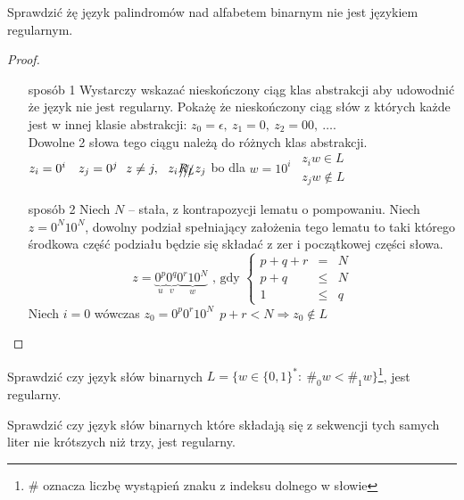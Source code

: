 	\begin{przyklad}
		Sprawdzić żę język palindromów nad alfabetem binarnym nie jest językiem regularnym.
		\begin{proof}
			\begin{itemize}
				\item[sposób 1] Wystarczy wskazać nieskończony ciąg klas abstrakcji aby udowodnić że język nie jest regularny.
				Pokażę że nieskończony ciąg słów z których każde jest w innej klasie abstrakcji: 
				$z_0 = \epsilon, ~ z_1 = 0, ~ z_2 = 00, ~\dots$.\\
				Dowolne 2 słowa tego ciągu należą do różnych klas abstrakcji.
				$z_i = 0^i \quad z_j = 0^j ~~ z \neq j, ~~ z_i  \xout{R_L}z_j$ bo dla $w = 10^i ~~
				\begin{matrix}
					z_iw \in L \\ z_jw \not\in L
				\end{matrix}$
				\item[sposób 2] Niech $N$ -- stała, z kontrapozycji lematu o pompowaniu. Niech $z = 0^N10^N$, dowolny podział
				spełniający założenia tego lematu to taki którego środkowa część podziału będzie się składać
				z zer i początkowej części słowa.
				$$z = \underbrace{0^p}_u\underbrace{0^q}_v\underbrace{0^r10^N}_w\text{ , gdy }
				\left\lbrace \begin{matrix}
					p+q+r &=& N \\ p + q &\leqslant& N \\ 1 &\leqslant& q
				\end{matrix} \right.$$
				 Niech $i=0$ wówczas $z_0 = 0^p0^r10^N ~~ p+r < N \Rightarrow z_0 \not\in L$
			\end{itemize}
		\end{proof}
	\end{przyklad}	
	
	\begin{zad}
		Sprawdzić czy język słów binarnych $L = \{ w\in \{0,1\}^*: ~ \#_0w < \#_1w\}$\footnote{$\#$ oznacza liczbę wystąpień znaku z 
		indeksu dolnego w słowie}, jest regularny.
	\end{zad}
	\begin{zad}
		Sprawdzić czy język słów binarnych które składają się z sekwencji tych samych liter nie krótszych niż trzy, jest regularny.
	\end{zad}
	